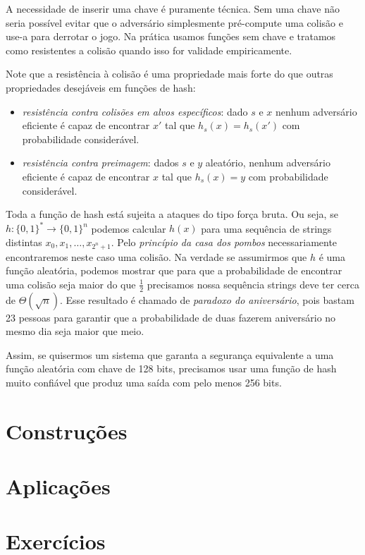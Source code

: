 A necessidade de inserir uma chave é puramente técnica.
Sem uma chave não seria possível evitar que o adversário simplesmente pré-compute uma colisão e use-a para derrotar o jogo.
Na prática usamos funções sem chave e tratamos como resistentes a colisão quando isso for validade empiricamente.

Note que a resistência à colisão é uma propriedade mais forte do que outras propriedades desejáveis em funções de hash:
\begin{itemize}
\item {\em resistência contra colisões em alvos específicos}: dado $s$ e $x$ nenhum adversário eficiente é capaz de encontrar $x'$ tal que $h_s(x) = h_s(x')$ com probabilidade considerável.
\item {\em resistência contra preimagem}: dados $s$ e $y$ aleatório, nenhum adversário eficiente é capaz de encontrar $x$ tal que $h_s(x) = y$ com probabilidade considerável. 
\end{itemize}

Toda a função de hash está sujeita a ataques do tipo força bruta.
Ou seja, se $h: \{0,1\}^* \to \{0,1\}^n$ podemos calcular $h(x)$ para uma sequência de strings distintas $x_0, x_1, \dots, x_{2^n+1}$.
Pelo {\em princípio da casa dos pombos} necessariamente encontraremos neste caso uma colisão.
Na verdade se assumirmos que $h$ é uma função aleatória, podemos mostrar que para que a probabilidade de encontrar uma colisão seja maior do que $\frac{1}{2}$ precisamos nossa sequência strings deve ter cerca de $\Theta(\sqrt{n})$.
Esse resultado é chamado de {\em paradoxo do aniversário}, pois bastam 23 pessoas para garantir que a probabilidade de duas fazerem aniversário no mesmo dia seja maior que meio.


\begin{theorem}

\end{theorem}

Assim, se quisermos um sistema que garanta a segurança equivalente a uma função aleatória com chave de 128 bits, precisamos usar uma função de hash muito confiável que produz uma saída com pelo menos 256 bits.

 
\section{Construções}
\label{sec:construcoes}

\section{Aplicações}
\label{sec:aplicacoes}

\section{Exercícios}
\label{sec:exercicios}


